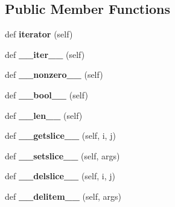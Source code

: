 \subsection*{Public Member Functions}
\begin{DoxyCompactItemize}
\item 
\mbox{\label{classinfomap_1_1StringVector_aeac9a1fb4911436f476a6f473488ff65}} 
def {\bfseries iterator} (self)
\item 
\mbox{\label{classinfomap_1_1StringVector_a292d6ac64b8012d202ef960c9cf895e6}} 
def {\bfseries \+\_\+\+\_\+iter\+\_\+\+\_\+} (self)
\item 
\mbox{\label{classinfomap_1_1StringVector_a867223ffe3adbdbc2c02b2355c853b85}} 
def {\bfseries \+\_\+\+\_\+nonzero\+\_\+\+\_\+} (self)
\item 
\mbox{\label{classinfomap_1_1StringVector_abe9031835b1d5ceaddf88b9e1187b85b}} 
def {\bfseries \+\_\+\+\_\+bool\+\_\+\+\_\+} (self)
\item 
\mbox{\label{classinfomap_1_1StringVector_ad8e59d32a348fb28724403ff7135418b}} 
def {\bfseries \+\_\+\+\_\+len\+\_\+\+\_\+} (self)
\item 
\mbox{\label{classinfomap_1_1StringVector_a70b7d57166daf210051317c2ca2db469}} 
def {\bfseries \+\_\+\+\_\+getslice\+\_\+\+\_\+} (self, i, j)
\item 
\mbox{\label{classinfomap_1_1StringVector_a2f1e737b15984aa9f60da7f54b54e140}} 
def {\bfseries \+\_\+\+\_\+setslice\+\_\+\+\_\+} (self, args)
\item 
\mbox{\label{classinfomap_1_1StringVector_ad1c64e8a39c768c3f533ddf20c7631db}} 
def {\bfseries \+\_\+\+\_\+delslice\+\_\+\+\_\+} (self, i, j)
\item 
\mbox{\label{classinfomap_1_1StringVector_a42cc89c1540d93866de40fe4fb84093f}} 
def {\bfseries \+\_\+\+\_\+delitem\+\_\+\+\_\+} (self, args)
\item 

\end{DoxyCompactItemize}
